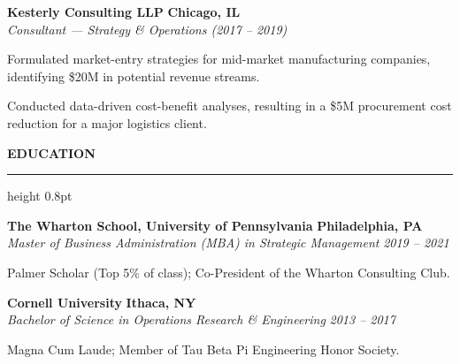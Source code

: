 \documentclass[10pt,letterpaper]{article}
\newcommand{\cvsection}[1]{%
  \vspace{9pt}%
  {\large\bfseries\color{accent}\MakeUppercase{#1}}%
  \vspace{3pt}%
  {\color{bordergray}\hrule height 0.8pt}%
  \vspace{5pt}%
}
\begin{document}
\vspace{5pt}
\textbf{Kesterly Consulting LLP} \hfill \textbf{Chicago, IL} \\
\textit{Consultant --- Strategy \& Operations (2017 -- 2019)}
\begin{cvitemize}
  \item Formulated market-entry strategies for mid-market manufacturing companies, identifying \$20M in potential revenue streams.
  \item Conducted data-driven cost-benefit analyses, resulting in a \$5M procurement cost reduction for a major logistics client.
\end{cvitemize}

\cvsection{Education}

\textbf{The Wharton School, University of Pennsylvania} \hfill \textbf{Philadelphia, PA} \\
\textit{Master of Business Administration (MBA) in Strategic Management} \hfill \textit{2019 -- 2021}
\begin{cvitemize}
  \item Palmer Scholar (Top 5\% of class); Co-President of the Wharton Consulting Club.
\end{cvitemize}

\vspace{5pt}
\textbf{Cornell University} \hfill \textbf{Ithaca, NY} \\
\textit{Bachelor of Science in Operations Research \& Engineering} \hfill \textit{2013 -- 2017}
\begin{cvitemize}
  \item Magna Cum Laude; Member of Tau Beta Pi Engineering Honor Society.
\end{cvitemize}
\end{document}
